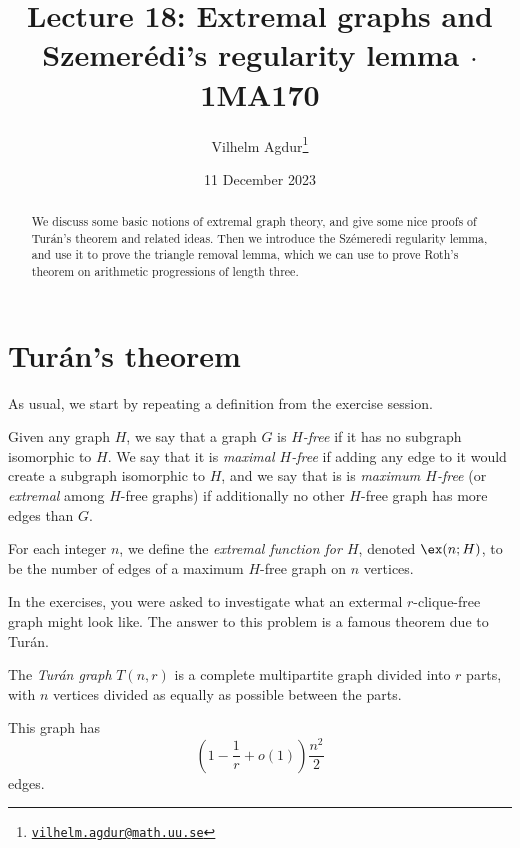 \documentclass[nobib]{tufte-handout}
\title{Lecture 18: Extremal graphs and Szemerédi's regularity lemma $\cdot$ 1MA170}
\author[Vilhelm Agdur]{Vilhelm Agdur\thanks{\href{mailto:vilhelm.agdur@math.uu.se}{\nolinkurl{vilhelm.agdur@math.uu.se}}}}
\date{11 December 2023}
\begin{document}
\maketitle%

\begin{abstract}
\noindent
We discuss some basic notions of extremal graph theory, and give some nice proofs of Turán's theorem and related ideas. Then we introduce the Szémeredi regularity lemma, and use it to prove the triangle removal lemma, which we can use to prove Roth's theorem on arithmetic progressions of length three.
\end{abstract}

\section{Turán's theorem}

As usual, we start by repeating a definition from the exercise session.

\begin{definition}
    Given any graph $H$, we say that a graph $G$ is \emph{$H$-free} if it has no subgraph isomorphic to $H$. We say that it is \emph{maximal $H$-free} if adding any edge to it would create a subgraph isomorphic to $H$, and we say that is is \emph{maximum $H$-free} (or \emph{extremal} among $H$-free graphs) if additionally no other $H$-free graph has more edges than $G$.
  
    For each integer $n$, we define the \emph{extremal function for $H$}, denoted $\ex(n; H)$, to be the number of edges of a maximum $H$-free graph on $n$ vertices.
\end{definition}

In the exercises, you were asked to investigate what an extermal $r$-clique-free graph might look like. The answer to this problem is a famous theorem due to Turán.

\begin{definition}
    The \emph{Turán graph} $T(n,r)$ is a complete multipartite graph divided into $r$ parts, with $n$ vertices divided as equally as possible between the parts.

    This graph has
    $$\left(1 - \frac{1}{r} + o(1)\right)\frac{n^2}{2}$$
    edges.
\end{definition}
\end{document}

